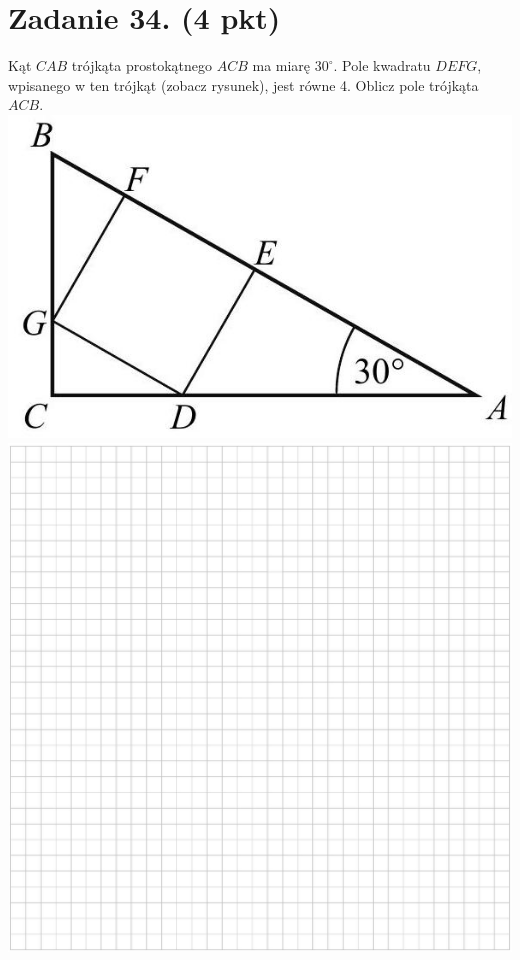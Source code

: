 \documentclass[10pt]{article}
\begin{document}
\section*{Zadanie 34. (4 pkt)}
Kąt \(C A B\) trójkąta prostokątnego \(A C B\) ma miarę \(30^{\circ}\). Pole kwadratu \(D E F G\), wpisanego w ten trójkąt (zobacz rysunek), jest równe 4. Oblicz pole trójkąta \(A C B\).\\
\includegraphics[max width=\textwidth, center]{2024_11_21_0c267759828927e3a26dg-18}\\
\includegraphics[max width=\textwidth, center]{2024_11_21_0c267759828927e3a26dg-18(1)}
\end{document}
